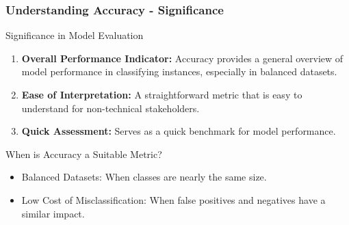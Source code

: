 \documentclass[aspectratio=169]{beamer}
\begin{document}
\begin{frame}[fragile]
    \frametitle{Understanding Accuracy - Significance}
    \begin{block}{Significance in Model Evaluation}
        \begin{enumerate}
            \item \textbf{Overall Performance Indicator:} 
                Accuracy provides a general overview of model performance in classifying instances, especially in balanced datasets.
            \item \textbf{Ease of Interpretation:} 
                A straightforward metric that is easy to understand for non-technical stakeholders.
            \item \textbf{Quick Assessment:} 
                Serves as a quick benchmark for model performance.
        \end{enumerate}
    \end{block}

    \begin{block}{When is Accuracy a Suitable Metric?}
        \begin{itemize}
            \item Balanced Datasets: When classes are nearly the same size.
            \item Low Cost of Misclassification: When false positives and negatives have a similar impact.
        \end{itemize}
    \end{block}
\end{frame}
\end{document}
